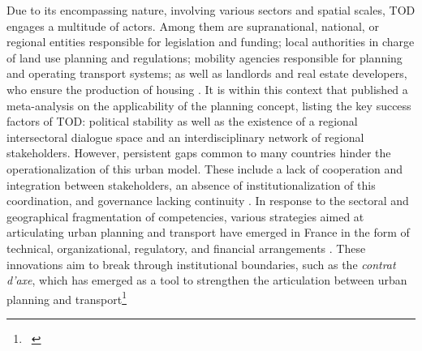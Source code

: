 \begin{refsegment}
Due to its encompassing nature, involving various sectors and spatial scales, \acrshort{TOD} engages a multitude of actors. Among them are supranational, national, or regional entities responsible for legislation and funding; local authorities in charge of land use planning and regulations; mobility agencies responsible for planning and operating transport systems; as well as landlords and real estate developers, who ensure the production of housing \textcolor{blue}{\autocite[8]{mathur_promoting_2020}}. It is within this context that \textcolor{blue}{\textcite[152]{thomas_defining_2017}} published a meta-analysis on the applicability of the planning concept, listing the key success factors of \acrshort{TOD}: political stability as well as the existence of a regional intersectoral dialogue space and an interdisciplinary network of regional stakeholders. However, persistent gaps common to many countries hinder the operationalization of this urban model. These include a lack of cooperation and integration between stakeholders, an absence of institutionalization of this coordination, and governance lacking continuity \textcolor{blue}{\autocite[124]{ibraeva_transit-oriented_2020}}. In response to the sectoral and geographical fragmentation of competencies, various strategies aimed at articulating urban planning and transport have emerged in France \textcolor{blue}{\autocites[10]{gallez_rooutils_2015}[2]{cerema_outils_2021}} in the form of  technical, organizational, regulatory, and financial arrangements \textcolor{blue}{\autocite[]{faure_regions_2006}}. These innovations aim to break through institutional boundaries, such as the \textsl{contrat d’axe}, which has emerged as a tool to strengthen the articulation between urban planning and transport\footnote{~
}
\end{refsegment}
